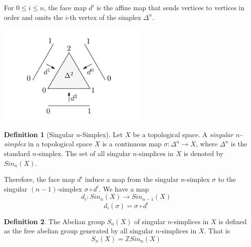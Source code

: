 \documentclass[11pt]{article}
\theoremstyle{definition}
\newtheorem{definition}{Definition}[section]
\theoremstyle{plain}
\begin{document}
For $0 \leq i \leq n $, the face map $d^i$ is the affine map that sends vertices to vertices in order and omits the  $i$-th vertex of the simplex $\Delta^n$.

\begin{center}
    \includegraphics[height=5cm]{face_maps.jpg}
\end{center}


\begin{definition}[Singular $n$-Simplex]
    Let $X$ be a topological space.  A \emph{singular $n$-simplex} in a topological space $X$ is a continuous map $\sigma : \Delta^n \to X$, where $\Delta^n$ is the standard $n$-simplex.
    The set of all singular $n$-simplices in $X$ is denoted by $Sin_n(X)$.
\end{definition}
\begin{center}
\end{center}

Therefore, the face map $d^i$ induce a map from the singular $n$-simplex $\sigma$ to the singular $(n-1)$-simplex $\sigma \circ d^i$. We have a map
\[
    d_i : Sin_n(X) \to Sin_{n-1}(X)
\]
\[
    d_i(\sigma)=\sigma \circ d^i
\]


\begin{definition}
    The Abelian group $S_n(X)$ of singular $n$-simplices in $X$ is defined as the free abelian group generated by all singular $n$-simplices in $X$. That is \[
        S_n(X)=\mathbb{Z}Sin_n(X)  \]
\end{definition}
\end{document}

